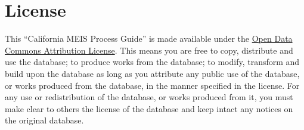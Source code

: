 \documentclass[
]{book}
\begin{document}
\hypertarget{license}{%
\chapter{License}\label{license}}

This ``California MEIS Process Guide'' is made available under the \href{http://opendatacommons.org/licenses/by/1.0/}{Open Data Commons Attribution License}. This means you are free to copy, distribute and use the database; to produce works from the database; to modify, transform and build upon the database as long as you attribute any public use of the database, or works produced from the database, in the manner specified in the license. For any use or redistribution of the database, or works produced from it, you must make clear to others the license of the database and keep intact any notices on the original database.

  
\end{document}
